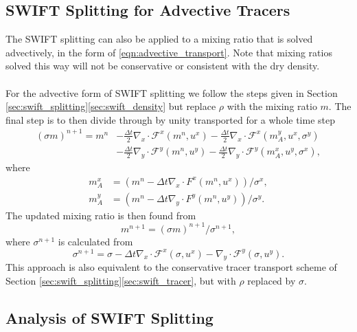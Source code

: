 \documentclass{ametsocV6.1}
\begin{document}
\subsection{SWIFT Splitting for Advective Tracers}

The SWIFT splitting can also be applied to a mixing ratio that is solved advectively, in the form of \eqref{eqn:advective_transport}. Note that mixing ratios solved this way will not be conservative or consistent with the dry density. \\ 
\\
For the advective form of SWIFT splitting we follow the steps given in Section \ref{sec:swift_splitting}\ref{sec:swift_density} but replace $\rho$ with the mixing ratio $m$. The final step is to then divide through by unity transported for a whole time step
\begin{equation}
\begin{split}
(\sigma m)^{n+1} = m^{n} & - \frac{\Delta{t}}{2}\nabla_x\cdot \mathcal{F}^x(m^n, u^x) - \frac{\Delta{t}}{2}\nabla_x\cdot \mathcal{F}^x(m^y_A, u^x, \sigma^y) \\
& - \frac{\Delta{t}}{2}\nabla_y\cdot \mathcal{F}^y(m^n, u^y) - \frac{\Delta{t}}{2}\nabla_y\cdot \mathcal{F}^y(m^x_A, u^y, \sigma^x),
\end{split}
\end{equation}
where
\begin{align}
    m^x_A &= (m^n - \Delta{t} \nabla_x\cdot F^x(m^n, u^x)) / \sigma^x, \\
    m^y_A &= (m^n - \Delta{t} \nabla_y\cdot F^y(m^n, u^y)) / \sigma^y.
\end{align}
The updated mixing ratio is then found from
\begin{equation}
m^{n+1} = (\sigma m)^{n+1}/\sigma^{n+1},
\end{equation}
where $\sigma^{n+1}$ is calculated from
\begin{equation}
\sigma^{n+1} = \sigma - \Delta{t} \nabla_x\cdot \mathcal{F}^x(\sigma, u^x) -  \nabla_y \cdot \mathcal{F}^y(\sigma, u^y).
\end{equation}
This approach is also equivalent to the conservative tracer transport scheme of Section \ref{sec:swift_splitting}\ref{sec:swift_tracer}, but with $\rho$ replaced by $\sigma$.

\subsection{Analysis of SWIFT Splitting}
\end{document}
